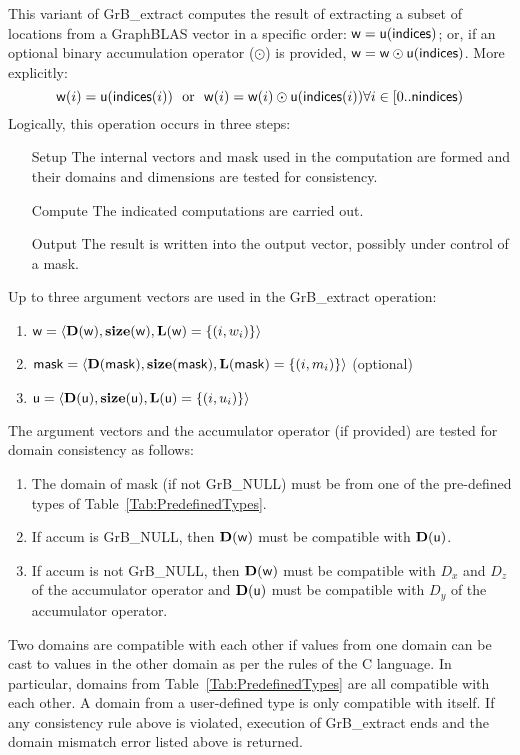 This variant of {\sf GrB\_extract} computes the result of extracting a subset of
locations from a GraphBLAS vector in a specific order: 
${\sf w} = {\sf u}({\sf indices})$; or, if an optional binary accumulation 
operator ($\odot$) is provided, ${\sf w} = {\sf w} \odot {\sf u}({\sf indices})$.  
More explicitly:
\[
    {\sf w}(i) = {\sf u}({\sf indices}(i)) \mbox{~~or~~} 
    {\sf w}(i) = {\sf w}(i) \odot {\sf u}({\sf indices}(i))
    \forall i \in \left[0..{\sf nindices}\right)
\]  
Logically, this operation occurs in three steps:
\begin{enumerate}[leftmargin=0.75in]
\item[Setup] The internal vectors and mask used in the computation are formed 
and their domains and dimensions are tested for consistency.
\item[Compute] The indicated computations are carried out.
\item[Output] The result is written into the output vector, possibly under 
control of a mask.
\end{enumerate}

Up to three argument vectors are used in the {\sf GrB\_extract} operation:
\begin{enumerate}
	\item ${\sf w} = \langle \bold{D}({\sf w}),\bold{size}({\sf w}),\bold{L}({\sf w}) = \{(i,w_i) \} \rangle$
	\item ${\sf mask} = \langle \bold{D}({\sf mask}),\bold{size}({\sf mask}),\bold{L}({\sf mask}) = \{(i,m_i) \} \rangle$ (optional)
	\item ${\sf u} = \langle \bold{D}({\sf u}),\bold{size}({\sf u}),\bold{L}({\sf u}) = \{(i,u_i) \} \rangle$
\end{enumerate}

The argument vectors and the accumulator 
operator (if provided) are tested for domain consistency as follows:
\begin{enumerate}
	\item The domain of {\sf mask} (if not {\sf GrB\_NULL}) must be from one of the pre-defined types of Table~\ref{Tab:PredefinedTypes}.

	\item If {\sf accum} is {\sf GrB\_NULL}, then $\bold{D}({\sf w})$ must be 
    compatible with $\bold{D}({\sf u})$.

	\item If {\sf accum} is not {\sf GrB\_NULL}, then $\bold{D}({\sf w})$ must be
    compatible with $D_x$ and $D_z$ of the accumulator operator and 
    $\bold{D}({\sf u})$ must be compatible with $D_y$ of the accumulator operator.
\end{enumerate}
Two domains are compatible with each other if values from one domain can be cast 
to values in the other domain as per the rules of the C language.
In particular, domains from Table~\ref{Tab:PredefinedTypes} are all compatible 
with each other. A domain from a user-defined type is only compatible with itself.
If any consistency rule above is violated, execution of {\sf GrB\_extract} ends
and the domain mismatch error listed above is returned.


